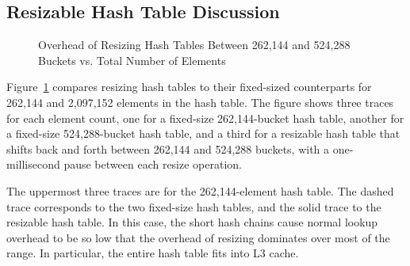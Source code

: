 \QuickQuizEnd

\subsection{Resizable Hash Table Discussion}
\label{sec:datastruct:Resizable Hash Table Discussion}

\begin{figure}[tb]
\centering
{}
\caption{Overhead of Resizing Hash Tables Between 262,144 and 524,288 Buckets vs. Total Number of Elements}
\label{fig:datastruct:Overhead of Resizing Hash Tables Between 262,144 and 524,288 Buckets vs. Total Number of Elements}
\end{figure}

Figure~\ref{fig:datastruct:Overhead of Resizing Hash Tables Between 262,144 and 524,288 Buckets vs. Total Number of Elements}
compares resizing hash tables to their fixed-sized counterparts
for 262,144 and 2,097,152 elements in the hash table.
The figure shows three traces for each element count, one
for a fixed-size 262,144-bucket hash table, another for a
fixed-size 524,288-bucket hash table, and a third for a resizable
hash table that shifts back and forth between 262,144 and 524,288
buckets, with a one-millisecond pause between each resize operation.

The uppermost three traces are for the 262,144-element hash table.
The dashed trace corresponds to the two fixed-size hash tables,
and the solid trace to the resizable hash table.
In this case, the short hash chains cause normal lookup overhead
to be so low that the overhead of resizing dominates over most
of the range.
In particular, the entire hash table fits into L3 cache.

